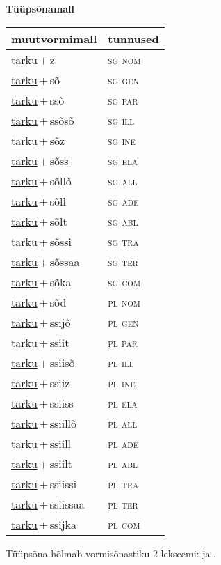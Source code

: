 
\vspace{1.8em}
\begin{minipage}{\textwidth}
\textbf{Tüüpsõnamall \,}\\

\begin{sideways}
\begin{tabular}{l l}
muutvormimall & tunnused \\
\hline
\underline{tarku}\,+\,z & \textsc{ sg nom } \\
\underline{tarku}\,+\,sõ & \textsc{ sg gen } \\
\underline{tarku}\,+\,ssõ & \textsc{ sg par } \\
\underline{tarku}\,+\,ssõsõ & \textsc{ sg ill } \\
\underline{tarku}\,+\,sõz & \textsc{ sg ine } \\
\underline{tarku}\,+\,sõss & \textsc{ sg ela } \\
\underline{tarku}\,+\,sõllõ & \textsc{ sg all } \\
\underline{tarku}\,+\,sõll & \textsc{ sg ade } \\
\underline{tarku}\,+\,sõlt & \textsc{ sg abl } \\
\underline{tarku}\,+\,sõssi & \textsc{ sg tra } \\
\underline{tarku}\,+\,sõssaa & \textsc{ sg ter } \\
\underline{tarku}\,+\,sõka & \textsc{ sg com } \\
\underline{tarku}\,+\,sõd & \textsc{ pl nom } \\
\underline{tarku}\,+\,ssijõ & \textsc{ pl gen } \\
\underline{tarku}\,+\,ssiit & \textsc{ pl par } \\
\underline{tarku}\,+\,ssiisõ & \textsc{ pl ill } \\
\underline{tarku}\,+\,ssiiz & \textsc{ pl ine } \\
\underline{tarku}\,+\,ssiiss & \textsc{ pl ela } \\
\underline{tarku}\,+\,ssiillõ & \textsc{ pl all } \\
\underline{tarku}\,+\,ssiill & \textsc{ pl ade } \\
\underline{tarku}\,+\,ssiilt & \textsc{ pl abl } \\
\underline{tarku}\,+\,ssiissi & \textsc{ pl tra } \\
\underline{tarku}\,+\,ssiissaa & \textsc{ pl ter } \\
\underline{tarku}\,+\,ssijka & \textsc{ pl com } \\
\end{tabular}
\end{sideways}
\label{tab:tüüpsõnamall-tarkuz}

\end{minipage}

 
\vspace{1em}
\noindent Tüüpsõna hõlmab vormisõnastiku 2 lekseemi:  ja .
